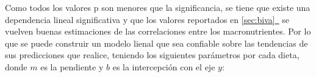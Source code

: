 \documentclass[12pt,a4paper]{article}
\newcommand{\fullref}[1]{%
  \hyperref[#1]{\cref*{#1}~\nameref*{#1}}%
}
\begin{document}
{{            %
            Como todos los valores p son menores que la significancia, se tiene que existe una 
            dependencia lineal significativa y que los valores 
            reportados en \fullref{sec:biva} se vuelven buenas estimaciones de las correlaciones entre los 
            macronutrientes. Por lo que se puede construir un modelo lienal que sea confiable 
            sobre las tendencias de sus predicciones que realice, teniendo los siguientes parámetros por 
            cada dieta, donde $m$ es la pendiente y $b$ es la intercepción con el eje $y$:

}}
\end{document}
